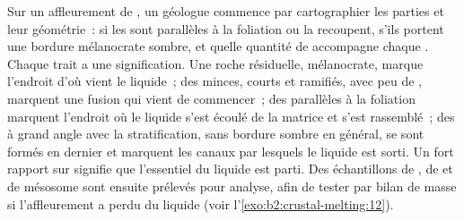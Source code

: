\begin{inthefield}
Sur un affleurement de , un géologue commence par cartographier les parties et leur géométrie~: si les
 sont parallèles à la foliation ou la recoupent, s'ils portent une bordure mélanocrate sombre,
et quelle quantité de  accompagne chaque . Chaque trait a une signification. Une roche
résiduelle, mélanocrate, marque l'endroit d'où vient le liquide~; des  minces, courts et ramifiés,
avec peu de , marquent une fusion qui vient de commencer~; des  parallèles à la foliation
marquent l'endroit où le liquide s'est écoulé de la matrice et s'est rassemblé~; des  à grand angle
avec la stratification, sans bordure sombre en général, se sont formés en dernier et marquent les canaux par lesquels
le liquide est sorti. Un fort rapport  sur  signifie que l'essentiel du liquide est parti.
Des échantillons de , de  et de mésosome sont ensuite prélevés pour analyse, afin de tester par bilan
de masse si l'affleurement a perdu du liquide (voir l'\cref{exo:b2:crustal-melting:12}).
\end{inthefield}

